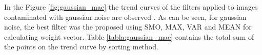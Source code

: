 %		
%
%
\normalsize

In the Figure \ref{fig:gaussian_mae} the trend curves of the filters applied to images contaminated with gaussian noise are observed . As can be seen, for gaussian noise, the best filter was the proposed using SMO, MAX, VAR and MEAN for calculating weight vector. Table \ref{tabla:gaussian_mae}  contains the total sum of the points on the trend curve  by sorting method.

